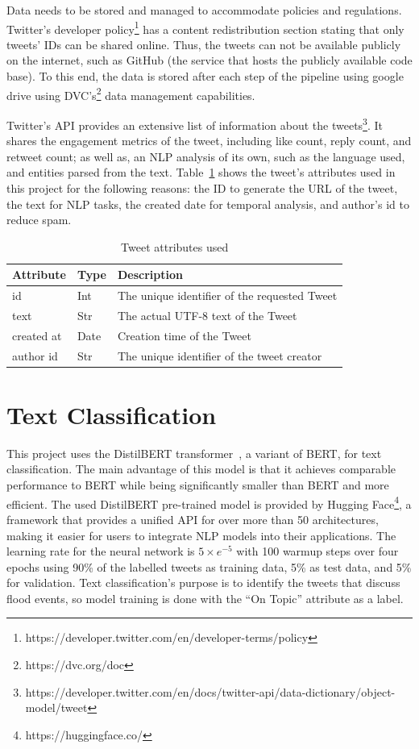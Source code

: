 Data needs to be stored and managed to accommodate policies and regulations. Twitter's developer
policy\footnote{https://developer.twitter.com/en/developer-terms/policy} has a content
redistribution section stating that only tweets' IDs can be shared online. Thus, the tweets can not
be available publicly on the internet, such as GitHub (the service that hosts the publicly available
code base). To this end, the data is stored after each step of the pipeline using google drive using
\ac{DVC}'s\footnote{https://dvc.org/doc} data management capabilities.

Twitter's \ac{API} provides an extensive list of information about the
tweets\footnote{https://developer.twitter.com/en/docs/twitter-api/data-dictionary/object-model/tweet}.
It shares the engagement metrics of the tweet, including like count, reply count, and retweet count;
as well as, an \ac{NLP} analysis of its own, such as the language used, and entities parsed from the
text. Table~\ref{tab:tweet_attr} shows the tweet's attributes used in this project for the following
reasons: the ID to generate the \ac{URL} of the tweet, the text for \ac{NLP} tasks, the created date
for temporal analysis, and author's id to reduce spam.

\begin{table}
  \center
  \caption{Tweet attributes used}
  \begin{tabular}{|l|l|l|}
    \hline
    Attribute & Type & Description \\
    \hline
    id & Int & The unique identifier of the requested Tweet \\
    \hline
    text & Str & The actual UTF-8 text of the Tweet \\
    \hline
    created at & Date  & Creation time of the Tweet \\
    \hline
    author id & Str & The unique identifier of the tweet creator \\
    \hline
  \end{tabular}
  \label{tab:tweet_attr}
\end{table}

\section{Text Classification}\label{sec:text_classification_section}

This project uses the DistilBERT transformer~\cite{Sanh2019DistilBERTAD}, a variant of \ac{BERT}, for
text classification. The main advantage of this model is that it achieves comparable performance to
BERT while being significantly smaller than BERT and more efficient. The used DistilBERT pre-trained
model is provided by Hugging Face\footnote{https://huggingface.co/}, a framework that provides a
unified \ac{API} for over more than 50 architectures, making it easier for users to integrate
\ac{NLP} models into their applications. The learning rate for the neural network is $5\times
e^{-5}$ with 100 warmup steps over four epochs using 90\% of the labelled tweets as training data,
5\% as test data, and 5\% for validation. Text classification's purpose is to identify the tweets
that discuss flood events, so model training is done with the ``On Topic'' attribute as a label. 

